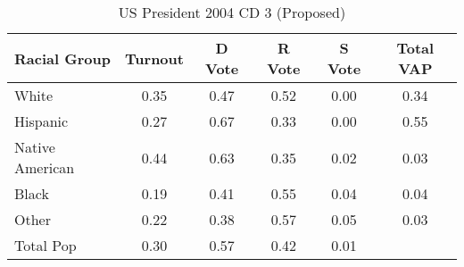 \begin{table}[htb]
\begin{center}
\caption{US President 2004 CD 3 (Proposed)}
\label{pres04_vap_cd_3}
\begin{tabular}{lccccc}
  \hline
Racial Group & Turnout & D Vote & R Vote & S Vote & Total VAP \\ 
  \hline
White & 0.35 & 0.47 & 0.52 & 0.00 & 0.34 \\ 
  Hispanic & 0.27 & 0.67 & 0.33 & 0.00 & 0.55 \\ 
  Native American & 0.44 & 0.63 & 0.35 & 0.02 & 0.03 \\ 
  Black & 0.19 & 0.41 & 0.55 & 0.04 & 0.04 \\ 
  Other & 0.22 & 0.38 & 0.57 & 0.05 & 0.03 \\ 
  Total Pop & 0.30 & 0.57 & 0.42 & 0.01 &  \\ 
   \hline
\end{tabular}
\end{center}
\end{table}
